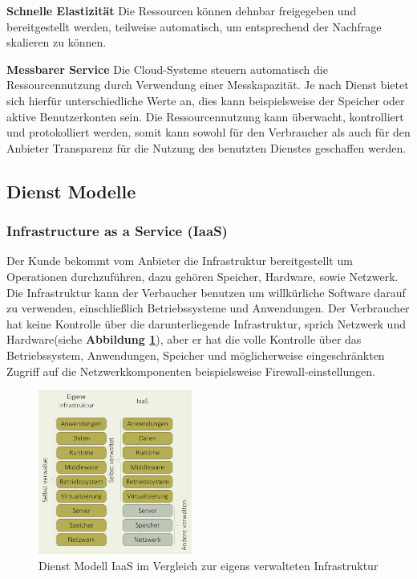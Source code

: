 \textbf{Schnelle Elastizität}
Die Ressourcen können dehnbar freigegeben und bereitgestellt werden, teilweise automatisch, um entsprechend der Nachfrage skalieren zu können\cite{nist_definition}.

\textbf{Messbarer Service}
Die Cloud-Systeme steuern automatisch die Ressourcennutzung durch Verwendung einer Messkapazität. Je nach Dienst bietet sich hierfür unterschiedliche Werte an, dies kann beispielsweise der Speicher oder aktive Benutzerkonten sein. Die Ressourcennutzung kann überwacht, kontrolliert und protokolliert werden, somit kann sowohl für den Verbraucher als auch für den Anbieter Transparenz für die Nutzung des benutzten Dienstes geschaffen werden\cite{nist_definition}.


\subsection{Dienst Modelle}
\subsubsection{Infrastructure as a Service (IaaS)} \label{IaaS}
Der Kunde bekommt vom Anbieter die Infrastruktur bereitgestellt um Operationen durchzuführen, dazu gehören Speicher, Hardware, sowie Netzwerk. Die Infrastruktur kann der Verbaucher benutzen um willkürliche Software darauf zu verwenden, einschließlich Betriebssysteme und Anwendungen. Der Verbraucher hat keine Kontrolle über die darunterliegende Infrastruktur, sprich Netzwerk und Hardware(siehe \textbf{Abbildung \ref{fig:iaas}}), aber er hat die volle Kontrolle über das Betriebssystem, Anwendungen, Speicher und möglicherweise eingeschränkten Zugriff auf die Netzwerkkomponenten beispielsweise Firewall-einstellungen\cite{nist_definition}.

\begin{figure}[H]
	\centering
	\includegraphics[width=0.45\textwidth]{Images/Iaas}
	\caption{Dienst Modell IaaS im Vergleich zur eigens verwalteten Infrastruktur}
	\label{fig:iaas}
\end{figure}

